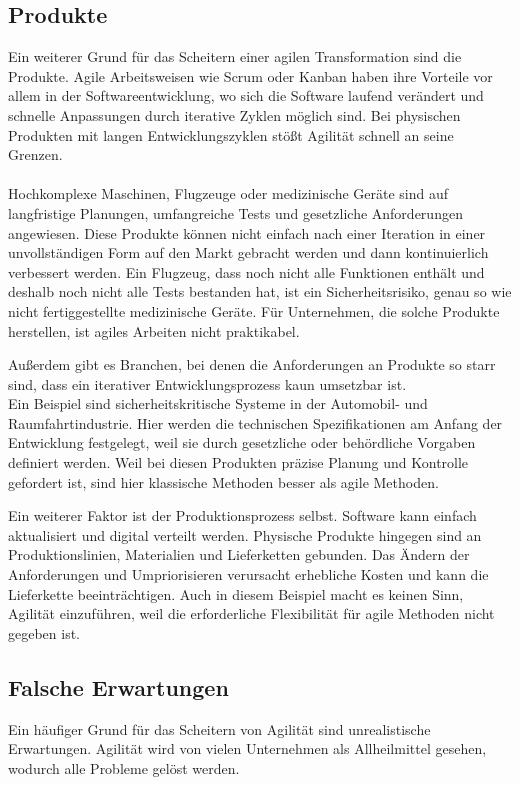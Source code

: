 \documentclass[ngerman]{seminarvorlage}
\begin{document}
\subsection{Produkte}

Ein weiterer Grund für das Scheitern einer agilen Transformation sind die Produkte. Agile Arbeitsweisen wie Scrum oder Kanban haben ihre Vorteile vor allem in der Softwareentwicklung, wo sich die Software laufend verändert und schnelle Anpassungen durch iterative Zyklen möglich sind. Bei physischen Produkten mit langen Entwicklungszyklen stößt Agilität schnell an seine Grenzen\cite{Simons.2021}.\\\\
Hochkomplexe Maschinen, Flugzeuge oder medizinische Geräte sind auf langfristige Planungen, umfangreiche Tests und gesetzliche Anforderungen angewiesen. Diese Produkte können nicht einfach nach einer Iteration in einer unvollständigen Form auf den Markt gebracht werden und dann kontinuierlich verbessert werden. Ein Flugzeug, dass noch nicht alle Funktionen enthält und deshalb noch nicht alle Tests bestanden hat, ist ein Sicherheitsrisiko, genau so wie nicht fertiggestellte medizinische Geräte. Für Unternehmen, die solche Produkte herstellen, ist agiles Arbeiten nicht praktikabel.

Außerdem gibt es Branchen, bei denen die Anforderungen an Produkte so starr sind, dass ein iterativer Entwicklungsprozess kaun umsetzbar ist.\\ Ein Beispiel sind sicherheitskritische Systeme in der Automobil- und Raumfahrtindustrie. Hier werden die technischen Spezifikationen am Anfang der Entwicklung festgelegt, weil sie durch gesetzliche oder behördliche Vorgaben definiert werden. Weil bei diesen Produkten präzise Planung und Kontrolle gefordert ist, sind hier klassische Methoden besser als agile Methoden.

Ein weiterer Faktor ist der Produktionsprozess selbst. Software kann einfach aktualisiert und digital verteilt werden. Physische Produkte hingegen sind an Produktionslinien, Materialien und Lieferketten gebunden. Das Ändern der Anforderungen und Umpriorisieren verursacht erhebliche Kosten und kann die Lieferkette beeinträchtigen. Auch in diesem Beispiel macht es keinen Sinn, Agilität einzuführen, weil die erforderliche Flexibilität für agile Methoden nicht gegeben ist.

\subsection{Falsche Erwartungen}
Ein häufiger Grund für das Scheitern von Agilität sind unrealistische Erwartungen. Agilität wird von vielen Unternehmen als Allheilmittel gesehen, wodurch alle Probleme gelöst werden.\\
\end{document}
